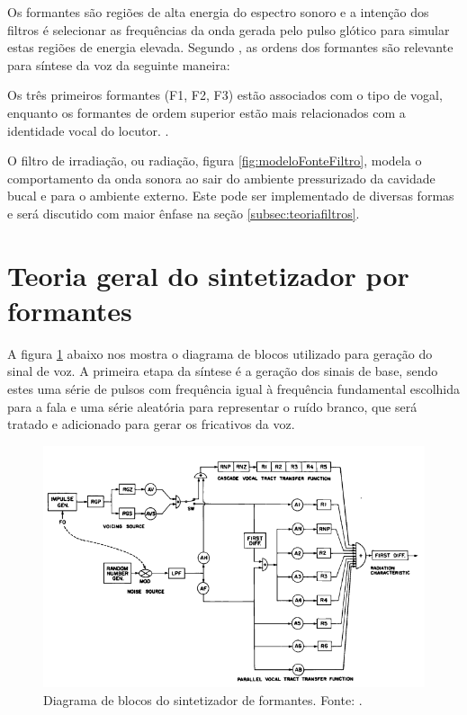 \documentclass[
  12pt,       
  openright,      
  twoside,      
  a4paper,      
  english,      
  french,       
  spanish,      
  brazil,     
  ]{abntex2}
\begin{document}
Os formantes são regiões de alta energia do espectro sonoro e a intenção dos filtros é selecionar as frequências da onda gerada pelo pulso glótico para simular estas regiões de energia elevada. Segundo , as ordens dos formantes são relevante para síntese da voz da seguinte maneira:

\begin{citacao}
Os três primeiros formantes (F1, F2, F3) estão associados com o tipo de vogal, enquanto os formantes de ordem superior estão mais relacionados com a identidade vocal do locutor. \cite{maurilio_1999}.
\end{citacao}

O filtro de irradiação, ou radiação, figura \ref{fig:modeloFonteFiltro}, modela o comportamento da onda sonora ao sair do ambiente pressurizado da cavidade bucal e para o ambiente externo. Este pode ser implementado de diversas formas e será discutido com maior ênfase na seção \ref{subsec:teoriafiltros}.

\section{Teoria geral do sintetizador por formantes}
\label{subsec:teoriaSintetizador}
A figura \ref{fig:blockDiagram} abaixo nos mostra o diagrama de blocos utilizado para  geração do sinal de voz. A primeira etapa da síntese é a geração dos sinais de base, sendo estes uma série de pulsos com frequência igual à frequência fundamental escolhida para a fala e uma série aleatória para representar o ruído branco, que será tratado e adicionado para gerar os fricativos da voz.

\begin{figure}
\includegraphics[width=\textwidth,keepaspectratio]{topografia_do_sintetizador}
\caption{Diagrama de blocos do sintetizador de formantes. Fonte: .}
\label{fig:blockDiagram}
\end{figure}
\end{document}

